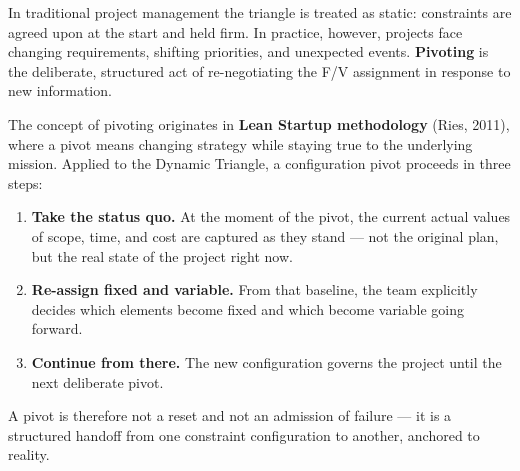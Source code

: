 \documentclass[11pt,a4paper]{article}
\begin{document}
In traditional project management the triangle is treated as static:
constraints are agreed upon at the start and held firm. In practice,
however, projects face changing requirements, shifting priorities, and
unexpected events. \textbf{Pivoting} is the deliberate, structured act
of re-negotiating the F/V assignment in response to new information.

The concept of pivoting originates in \textbf{Lean Startup methodology}
(Ries, 2011), where a pivot means changing strategy while staying true
to the underlying mission. Applied to the Dynamic Triangle, a
configuration pivot proceeds in three steps:

\begin{enumerate}[leftmargin=*]
  \item \textbf{Take the status quo.} At the moment of the pivot, the
  current actual values of scope, time, and cost are captured as they
  stand --- not the original plan, but the real state of the project
  right now.
  \item \textbf{Re-assign fixed and variable.} From that baseline, the
  team explicitly decides which elements become fixed and which become
  variable going forward.
  \item \textbf{Continue from there.} The new configuration governs the
  project until the next deliberate pivot.
\end{enumerate}

A pivot is therefore not a reset and not an admission of failure --- it
is a structured handoff from one constraint configuration to another,
anchored to reality.
\end{document}
